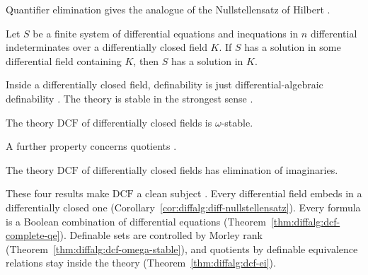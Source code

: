 Quantifier elimination gives the analogue of the Nullstellensatz of
Hilbert
\cite[pp.~129--132]{Wood1998DifferentiallyClosed}.

\begin{corollary}\label{cor:diffalg:diff-nullstellensatz}
Let $S$ be a finite system of differential equations and inequations in
$n$ differential indeterminates over a differentially closed field $K$.
If $S$ has a solution in some differential field containing $K$, then
$S$ has a solution in $K$.
\end{corollary}

Inside a differentially closed field, definability is just
differential-algebraic definability
\cite[pp.~132--134]{Wood1998DifferentiallyClosed}. The theory is stable
in the strongest sense \cite[p.~134]{Wood1998DifferentiallyClosed}.

\begin{theorem}\label{thm:diffalg:dcf-omega-stable}
The theory $\mathrm{DCF}$ of differentially closed fields is
$\omega$-stable.
\end{theorem}

A further property concerns quotients
\cite[pp.~133--134]{Wood1998DifferentiallyClosed}.

\begin{theorem}\label{thm:diffalg:dcf-ei}
The theory $\mathrm{DCF}$ of differentially closed fields has
elimination of imaginaries.
\end{theorem}

These four results make $\mathrm{DCF}$ a clean subject
\cite[pp.~129--134]{Wood1998DifferentiallyClosed}. Every differential
field embeds in a differentially closed one
(Corollary~\ref{cor:diffalg:diff-nullstellensatz}). Every formula is a
Boolean combination of differential equations
(Theorem~\ref{thm:diffalg:dcf-complete-qe}). Definable sets are
controlled by Morley rank
(Theorem~\ref{thm:diffalg:dcf-omega-stable}), and quotients by definable
equivalence relations stay inside the theory
(Theorem~\ref{thm:diffalg:dcf-ei}).

